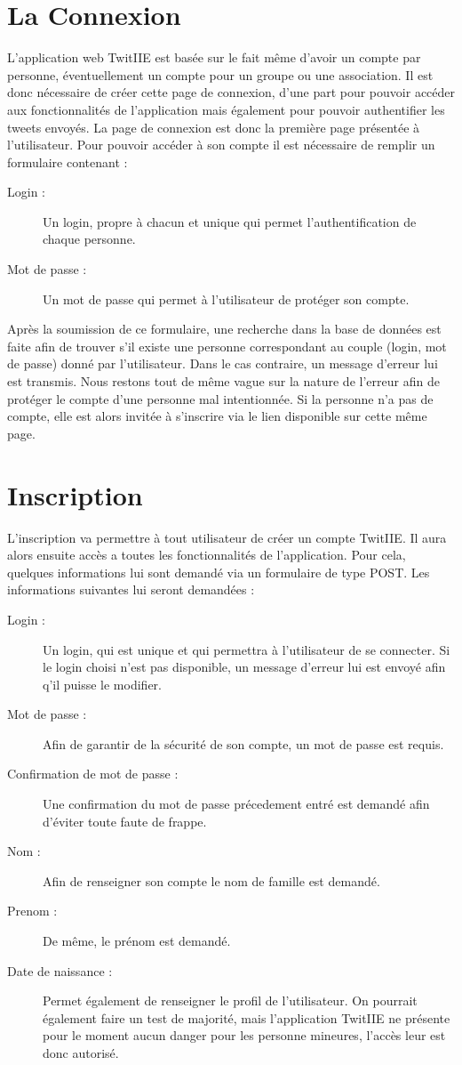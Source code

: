 \documentclass[a4paper, 12pt]{article}
\begin{document}
\section{La Connexion}	
L'application web TwitIIE est basée sur le fait même d'avoir un compte par personne, éventuellement un compte pour un groupe ou une association. Il est donc nécessaire de créer cette page de connexion, d'une part pour pouvoir accéder aux fonctionnalités de l'application mais également pour pouvoir authentifier les tweets envoyés.
La page de connexion est donc la première page présentée à l'utilisateur. Pour pouvoir accéder à son compte il est nécessaire de remplir un formulaire contenant : 
\begin{description}
\item[Login :] Un login, propre à chacun et unique qui permet l'authentification de chaque personne.
\item[Mot de passe :] Un mot de passe qui permet à l'utilisateur de protéger son compte.
\end{description}
Après la soumission de ce formulaire, une recherche dans la base de données est faite afin de trouver s'il existe une personne correspondant au couple (login, mot de passe) donné par l'utilisateur.
Dans le cas contraire, un message d'erreur lui est transmis. Nous restons tout de même vague sur la nature de l'erreur afin de protéger le compte d'une personne mal intentionnée.
Si la personne n'a pas de compte, elle est alors invitée à s'inscrire via le lien disponible sur cette même page. 

\section{Inscription}
L'inscription va permettre à tout utilisateur de créer un compte TwitIIE. Il aura alors ensuite accès a toutes les fonctionnalités de l'application.
Pour cela, quelques informations lui sont demandé via un formulaire de type POST. Les informations suivantes lui seront demandées : 
\begin{description}
\item[Login :] Un login, qui est unique et qui permettra à l'utilisateur de se connecter. Si le login choisi n'est pas disponible, un message d'erreur lui est envoyé afin q'il puisse le modifier.
\item[Mot de passe :] Afin de garantir de la sécurité de son compte, un mot de passe est requis.
\item[Confirmation de mot de passe :] Une confirmation du mot de passe précedement entré est demandé afin d'éviter toute faute de frappe.
\item[Nom :] Afin de renseigner son compte le nom de famille est demandé.
\item[Prenom :] De même, le prénom est demandé.
\item[Date de naissance :] Permet également de renseigner le profil de l'utilisateur. On pourrait également faire un test de majorité, mais l'application TwitIIE ne présente pour le moment aucun danger pour les personne mineures, l'accès leur est donc autorisé.
\end{description}
\end{document}
